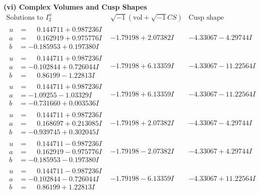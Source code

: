 \documentclass[1p]{elsarticle_modified}
\theoremstyle{definition}
\newcommand{\I}{\sqrt{-1}}
\begin{document}
\newpage\flushleft \textbf{(vi) Complex Volumes and Cusp Shapes}
$$\begin{array}{c|c|c}  
\text{Solutions to }I^u_{2}& \I (\text{vol} + \sqrt{-1}CS) & \text{Cusp shape}\\
 \hline 
\begin{aligned}
u &= \phantom{-}0.144711 + 0.987236 I \\
a &= \phantom{-}0.162919 + 0.975776 I \\
b &= -0.185953 + 0.197380 I\end{aligned}
 & -1.79198 + 2.07382 I & -4.33067 - 4.29744 I \\ \hline\begin{aligned}
u &= \phantom{-}0.144711 + 0.987236 I \\
a &= -0.102844 + 0.726044 I \\
b &= \phantom{-}0.86199 - 1.22813 I\end{aligned}
 & -1.79198 + 6.13359 I & -4.33067 - 11.22564 I \\ \hline\begin{aligned}
u &= \phantom{-}0.144711 + 0.987236 I \\
a &= -1.09255 - 1.03329 I \\
b &= -0.731660 + 0.003536 I\end{aligned}
 & -1.79198 + 6.13359 I & -4.33067 - 11.22564 I \\ \hline\begin{aligned}
u &= \phantom{-}0.144711 + 0.987236 I \\
a &= \phantom{-}0.168697 + 0.213085 I \\
b &= -0.939745 + 0.302045 I\end{aligned}
 & -1.79198 + 2.07382 I & -4.33067 - 4.29744 I \\ \hline\begin{aligned}
u &= \phantom{-}0.144711 - 0.987236 I \\
a &= \phantom{-}0.162919 - 0.975776 I \\
b &= -0.185953 - 0.197380 I\end{aligned}
 & -1.79198 - 2.07382 I & -4.33067 + 4.29744 I \\ \hline\begin{aligned}
u &= \phantom{-}0.144711 - 0.987236 I \\
a &= -0.102844 - 0.726044 I \\
b &= \phantom{-}0.86199 + 1.22813 I\end{aligned}
 & -1.79198 - 6.13359 I & -4.33067 + 11.22564 I \\ \hline\begin{aligned}

\end{aligned}
\end{array}$$
\end{document}
